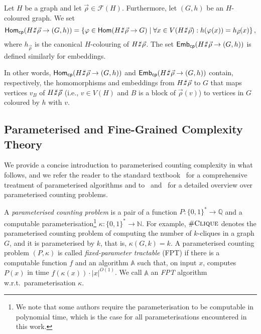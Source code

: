 \documentclass[authorcolumns,numberwithinsect]{no-lipics-v2022}
\newcommand{\homs}[2]{\mathsf{Hom}(#1 \to #2)}
\def\fracture#1#2{\ensuremath{#1\raisebox{.2ex}{\rotatebox[origin=c]{-15}{$\sharp$}}#2}}
\newcommand{\homscp}{\mathsf{Hom}_{\mathsf{cp}}}
\newcommand{\embscp}{\mathsf{Emb}_{\mathsf{cp}}}
\def\fracture#1#2{\ensuremath{#1\raisebox{.2ex}{\rotatebox[origin=c]{-15}{$\sharp$}}#2}}
\begin{document}
\begin{definition}[$\homscp,\embscp$]
    Let $H$ be a graph and let $\vec{\rho}\in\mathcal{F}(H)$. Furthermore, let $(G,h)$ be an $H$-coloured graph. We set
    \[ \homscp(\fracture{H}{\vec{\rho}} \to (G,h))= \{\varphi \in \homs{\fracture{H}{\vec{\rho}}}{G} \mid \forall x \in V(\fracture{H}{\vec{\rho}}): h(\varphi(x)) = h_{\vec{\rho}}(x) \} \,, \]
    where $h_{\vec{\rho}}$ is the canonical $H$-colouring of $\fracture{H}{\vec{\rho}}$. The set $\embscp(\fracture{H}{\vec{\rho}} \to (G,h))$ is defined similarly for embeddings.
\end{definition}
In other words, $\homscp(\fracture{H}{\vec{\rho}} \to (G,h))$ and $\embscp(\fracture{H}{\vec{\rho}} \to (G,h))$ contain, respectively, the homomorphisms and embeddings from $\fracture{H}{\vec{\rho}} $ to $G$ that maps vertices $v_B$ of $\fracture{H}{\vec{\rho}}$ (i.e., $v\in V(H)$ and $B$ is a block of $\vec{\rho}(v)$) to vertices in $G$ coloured by $h$ with $v$.





\subsection{Parameterised and Fine-Grained Complexity Theory}
We provide a concise introduction to parameterised counting complexity in what follows, and we refer the reader to the standard textbook~\cite{CyganFKLMPPS15} for a comprehensive treatment of parameterised algorithms and to~\cite[Chapter 14]{FlumG06} and~\cite{Curticapean15} for a detailed overview over parameterised counting problems.  


A \emph{parameterised counting problem} is a pair of a function $P:\{0,1\}^\ast \to \mathbb{Q}$ and a computable parameterisation\footnote{We note that some authors require the parameterisation to be computable in polynomial time, which is the case for all parameterisations encountered in this work.} $\kappa: \{0,1\}^\ast \to \mathbb{N}$. For example, $\#\textsc{Clique}$ denotes the parameterised counting problem of computing the number of $k$-cliques in a graph $G$, and it is parameterised by $k$, that is, $\kappa(G,k)=k$.
A parameterised counting problem $(P,\kappa)$ is called \emph{fixed-parameter tractable} (FPT) if there is a computable function $f$ and an algorithm $\mathbb{A}$ such that, on input $x$, computes $P(x)$ in time $f(\kappa(x))\cdot |x|^{O(1)}$. We call $\mathbb{A}$ an \emph{FPT} algorithm w.r.t.\ parameterisation $\kappa$.
\end{document}
